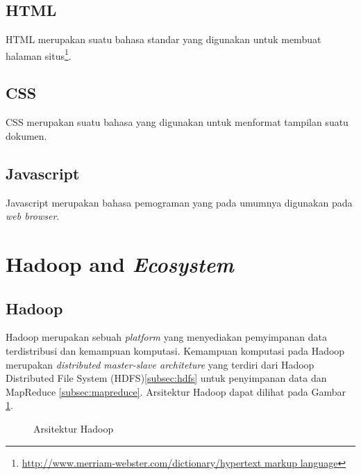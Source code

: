 \subsection{HTML}
\label{subsec:html}

HTML merupakan suatu bahasa standar yang digunakan untuk membuat halaman situs\footnote{\url{http://www.merriam-webster.com/dictionary/hypertext markup language}}.

\subsection{CSS}
\label{subsec:css}

CSS merupakan suatu bahasa yang digunakan untuk menformat tampilan suatu dokumen.

\subsection{Javascript}
\label{subsec:javascript}

Javascript merupakan bahasa pemograman yang pada umumnya digunakan pada \textit{web browser}.

\section{Hadoop and \textit{Ecosystem}}
\label{sec:hadoopandecosystem}

\subsection{Hadoop}
\label{subsec:hadoop}

Hadoop merupakan sebuah \textit{platform} yang menyediakan pemyimpanan data terdistribusi dan kemampuan komputasi. Kemampuan komputasi pada Hadoop merupakan \textit{distributed master-slave architeture} yang terdiri dari Hadoop Distributed File System (HDFS)\ref{subsec:hdfs} untuk penyimpanan data dan MapReduce \ref{subsec:mapreduce}. Arsitektur Hadoop dapat dilihat pada Gambar \ref{fig:arsitektur_hadoop}\cite{holmes2012hadoop}.

\begin{figure}
\centering
{}
\caption[Arsitektur Hadoop]{Arsitektur Hadoop} 
\label{fig:arsitektur_hadoop}
\end{figure}


